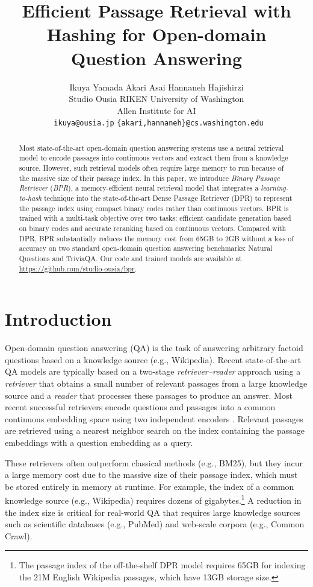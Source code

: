 \documentclass[11pt,a4paper]{article}
\title{Efficient Passage Retrieval with Hashing for Open-domain\\Question Answering}
\author{
    Ikuya Yamada\qquad
    Akari Asai\qquad
    Hannaneh Hajishirzi\\
    Studio Ousia \quad
    RIKEN \quad
    University of Washington\\
    Allen Institute for AI \\\
    \texttt{ikuya@ousia.jp} \quad 
    \texttt{\{akari,hannaneh\}@cs.washington.edu} \\ 
}
\date{}
\begin{document}
\maketitle
\begin{abstract}
  Most state-of-the-art open-domain question answering systems use a neural retrieval model to encode passages into continuous vectors and extract them from a knowledge source. However, such retrieval models often require large memory to run because of the massive size of their passage index.
  In this paper, we introduce \textit{Binary Passage Retriever} (\textit{BPR}), a memory-efficient neural retrieval model that integrates a \textit{learning-to-hash} technique into the state-of-the-art Dense Passage Retriever (DPR) \cite{Karpukhin2020DenseAnswering} to represent the passage index using compact binary codes rather than continuous vectors.
  BPR is trained with a  multi-task objective over two tasks: efficient candidate generation based on binary codes and accurate reranking based on continuous vectors.
  Compared with DPR, BPR substantially reduces the memory cost from 65GB to 2GB without a loss of accuracy on two standard open-domain question answering benchmarks: Natural Questions and TriviaQA.
  Our code and trained models are available at \url{https://github.com/studio-ousia/bpr}.
\end{abstract}

\section{Introduction}
Open-domain question answering (QA) is the task of answering arbitrary factoid questions based on a knowledge source (e.g., Wikipedia).
Recent state-of-the-art QA models are typically based on a two-stage \textit{retriever--reader} approach  \cite{Chen2017ReadingQuestions} using a \textit{retriever} that obtains a small number of relevant passages from a large knowledge source and a \textit{reader} that processes these passages to produce an answer.
Most recent successful retrievers encode questions and passages into a common continuous embedding space using two independent encoders \cite{Lee2019LatentAnswering,Karpukhin2020DenseAnswering,Guu2020}.
Relevant passages are retrieved using a nearest neighbor search on the index containing the passage embeddings with a question embedding as a query.

These retrievers often outperform classical methods (e.g., BM25), but they incur a large memory cost due to the massive size of their passage index, which must be stored entirely in memory at runtime.
For example, the index of a common knowledge source (e.g., Wikipedia) requires dozens of gigabytes.\footnote{The passage index of the off-the-shelf DPR model \cite{Karpukhin2020DenseAnswering} requires 65GB for indexing the 21M English Wikipedia passages, which have 13GB storage size.}
A reduction in the index size is critical for real-world QA that requires large knowledge sources such as scientific databases (e.g., PubMed) and web-scale corpora (e.g., Common Crawl).
\end{document}
